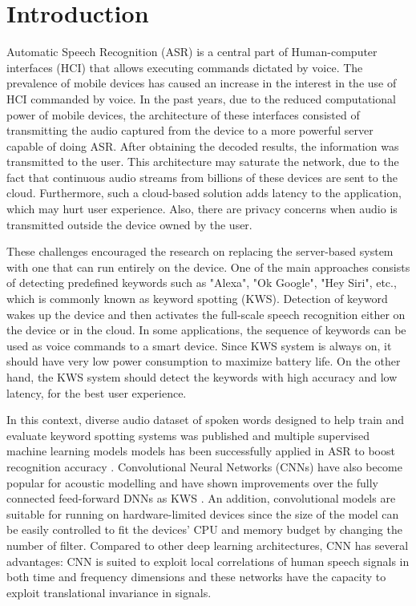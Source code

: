 
\section{Introduction}
\label{sec:introduction}
Automatic Speech Recognition (ASR) is a central part of Human-computer interfaces (HCI) that allows executing commands dictated by voice. The prevalence of mobile devices has caused an increase in the interest in the use of HCI commanded by voice. In the past years, due to the reduced computational power of mobile devices, the architecture of these interfaces consisted of transmitting the audio captured from the device to a more powerful server capable of doing ASR. After obtaining the decoded results, the information was transmitted to the user. This architecture may saturate the network, due to the fact that continuous audio streams from billions of these devices are sent to the cloud. Furthermore, such a cloud-based solution adds latency to the application, which may hurt user experience.  Also, there are privacy concerns when audio is transmitted outside the device owned by the user.


These challenges encouraged the research on replacing the server-based system with one that can run entirely on the device. One of the main approaches consists of detecting predefined keywords such as "Alexa", "Ok Google", "Hey Siri", etc., which is commonly known as keyword spotting (KWS). Detection of keyword wakes up the device and then activates the full-scale speech recognition either on the device \cite{mcgraw2016personalized} or in the cloud.  In some applications, the sequence of keywords can be used as voice commands to a smart device. Since KWS system is always on, it should have very low power consumption to maximize battery life. On the other hand, the KWS system should detect the keywords with high accuracy and low latency, for the best user experience.

In this context, diverse audio dataset of spoken words designed to help train and evaluate keyword spotting systems was published \cite{warden2018speech} and multiple supervised machine learning models models has been successfully applied in ASR to boost recognition accuracy \cite{yu2014automatic}. 
Convolutional Neural Networks (CNNs) have also become popular for acoustic modelling and have shown improvements over the fully connected feed-forward DNNs as KWS \cite{sainath2015convolutional} \cite{chen2014small}. An addition, convolutional models are suitable for running on hardware-limited devices since the size of the model can be easily controlled to fit the devices’ CPU and memory budget by changing the number of filter.  Compared to other deep learning architectures, CNN has several advantages: CNN is suited to exploit local correlations of human speech signals in both time and frequency dimensions and these networks have the capacity to exploit translational invariance in signals.


